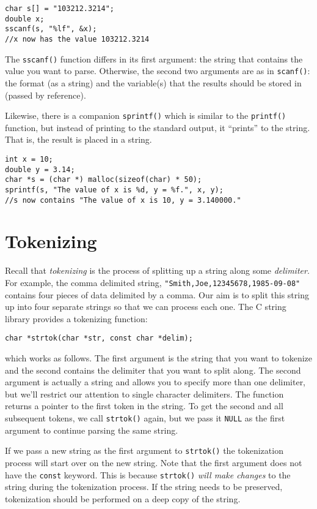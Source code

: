 \begin{verbatim}
char s[] = "103212.3214";
double x;
sscanf(s, "%lf", &x);
//x now has the value 103212.3214
\end{verbatim}

The \texttt{sscanf()} function differs in its first 
argument: the string that contains the value you want to parse.
Otherwise, the second two arguments are as in \texttt{scanf()}:
the format (as a string) and the variable(s) that the results
should be stored in (passed by reference).

Likewise, there is a companion \texttt{sprintf()} which
is similar to the \texttt{printf()} function, but instead
of printing to the standard output, it ``prints'' to the string.
That is, the result is placed in a string.

\begin{verbatim}
int x = 10;
double y = 3.14;
char *s = (char *) malloc(sizeof(char) * 50);
sprintf(s, "The value of x is %d, y = %f.", x, y);
//s now contains "The value of x is 10, y = 3.140000."
\end{verbatim}

\section{Tokenizing}

Recall that \emph{tokenizing} is the process of splitting
up a string along some \emph{delimiter}.  For example, 
the comma delimited string, \texttt{"Smith,Joe,12345678,1985-09-08"}
contains four pieces of data delimited by a comma.  
Our aim is to split this string up into four separate 
strings so that we can process each one. The C string library 
provides a tokenizing function:

\texttt{char *strtok(char *str, const char *delim);}

which works as follows.  The first argument is the string
that you want to tokenize and the second contains the
delimiter that you want to split along.  The second argument
is actually a string and allows you to specify more than one
delimiter, but we'll restrict our attention to single 
character delimiters.  The function returns a pointer to
the first token in the string.  To get the second and
all subsequent tokens, we call \texttt{strtok()} 
again, but we pass it \texttt{NULL} as the first
argument to continue parsing the same string. 

If we pass a new string as the first argument to 
\texttt{strtok()} the tokenization process will
start over on the new string.  Note that the first
argument does not have the \texttt{const} keyword.
This is because \texttt{strtok()} \emph{will make
changes} to the string during the tokenization process.
If the string needs to be preserved, tokenization should
be performed on a deep copy of the string.

